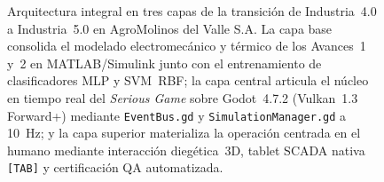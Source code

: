 \begin{figure}[!t]
{%
}
\caption{Arquitectura integral en tres capas de la transición de Industria~4.0 a Industria~5.0 en AgroMolinos del Valle S.A. La capa base consolida el modelado electromecánico y térmico de los Avances~1 y~2 en MATLAB/Simulink junto con el entrenamiento de clasificadores MLP y SVM~RBF; la capa central articula el núcleo en tiempo real del \textit{Serious Game} sobre Godot~4.7.2 (Vulkan~1.3 Forward+) mediante \texttt{EventBus.gd} y \texttt{SimulationManager.gd} a \SI{10}{\hertz}; y la capa superior materializa la operación centrada en el humano mediante interacción diegética~3D, tablet SCADA nativa \texttt{[TAB]} y certificación QA automatizada.}
\label{fig:arquitectura_global}
\end{figure}
